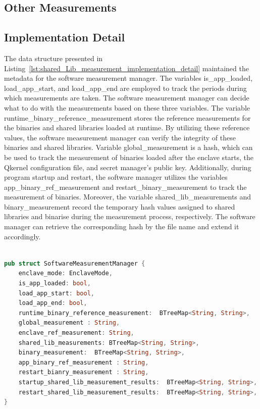 \subsection{Other Measurements}

\subsection{Implementation Detail}
The data structure presented in Listing~\ref{lst:shared_Lib_measurement_implementation_detail} maintained the metadata for the software measurement manager. The variables is\_app\_loaded, load\_app\_start, and load\_app\_end are employed to track the periods during which measurements are taken. 
The software measurement manager can decide what to do with the measurements based on these three variables. The variable runtime\_binary\_reference\_measurement stores the reference measurements for the binaries and shared libraries loaded at runtime. By utilizing these reference values, the software 
measurement manager can verify the integrity of these binaries and shared libraries. Variable global\_measurement is a hash, which can be used to track the measurement of binaries loaded after the enclave starts, the Qkernel configuration file, and secret manager’s public key.
Additionally, during program startup and restart, the software manager utilizes the variables app\_binary\_ref\_measurement and restart\_binary\_measurement to track the measurement of binaries. Moreover, the variable shared\_lib\_measurements and binary\_measurement record the temporary hash values 
assigned to shared libraries and binarise during the measurement process, respectively. The software manager can retrieve the corresponding hash by the file name and extend it accordingly.


\begin{lstlisting}[language=rust, caption= Interface for accessing the file type secrets, label={lst:shared_Lib_measurement_implementation_detail}]

pub struct SoftwareMeasurementManager {
    enclave_mode: EnclaveMode,
    is_app_loaded: bool,
    load_app_start: bool,
    load_app_end: bool,
    runtime_binary_reference_measurement:  BTreeMap<String, String>,
    global_measurement : String,
    enclave_ref_measurement: String,
    shared_lib_measurements: BTreeMap<String, String>,
    binary_measurement:  BTreeMap<String, String>,
    app_binary_ref_measurement : String,
    restart_bianry_measurement : String,
    startup_shared_lib_measurement_results:  BTreeMap<String, String>,
    restart_shared_lib_measurement_results:  BTreeMap<String, String>,
}
    
\end{lstlisting}

